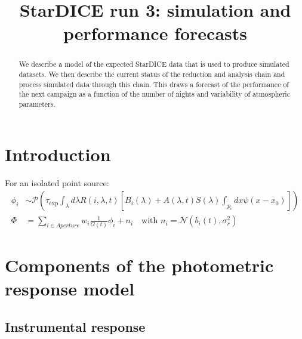\documentclass[\docopts]{\docclass}
\begin{document}
\title{ StarDICE run 3: simulation and performance forecasts }

\maketitlepre

\begin{abstract}
  We describe a model of the expected StarDICE data that is used to
  produce simulated datasets. We then describe the current status of
  the reduction and analysis chain and process simulated data through
  this chain. This draws a forecast of the performance of the next
  campaign as a function of the number of nights and variability of
  atmospheric parameters.
\end{abstract}


\maketitlepost

% 

\section{Introduction}
\label{sec:intro}

For an isolated point source:
\begin{equation}
  \begin{split}
    \phi_i & \sim \mathcal{P}\left(\tau_\text{exp} \int_{\lambda} d\lambda R(i, \lambda, t) \left[B_i(\lambda) + A(\lambda, t) S(\lambda)\int_{p_i} dx \psi(x - x_0)\right] \right)\\
    \Phi & = \sum_{i \in {Aperture}} w_i \frac1{G(t)} \phi_i + n_i  \quad \text{with } n_i = \mathcal{N}(b_i(t), \sigma_r^2) 
\end{split}
\end{equation}


\section{Components of the photometric response model}
\label{sec:model}

\subsection{Instrumental response}
\label{sec:instrument}
\end{document}
